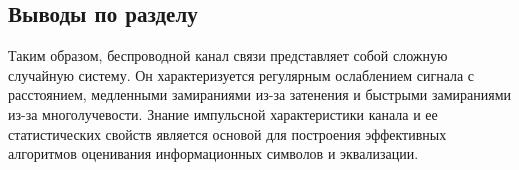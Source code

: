 \subsection*{Выводы по разделу}

Таким образом, беспроводной канал связи представляет собой сложную случайную систему. Он характеризуется регулярным ослаблением сигнала с расстоянием, медленными замираниями из-за затенения и быстрыми замираниями из-за многолучевости. Знание импульсной характеристики канала и ее статистических свойств является основой для построения эффективных алгоритмов оценивания информационных символов и эквализации.